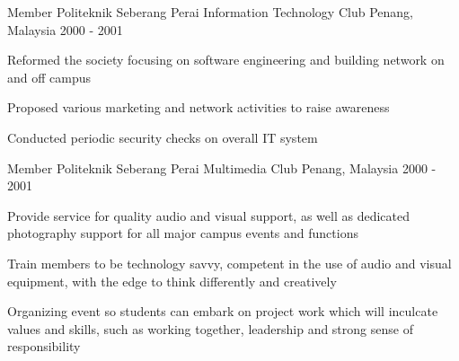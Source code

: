 

\begin{cventries}

  \cventry
    {Member} %
    {Politeknik Seberang Perai Information Technology Club} %
    {Penang, Malaysia} %
    {2000 - 2001} %
    {
      \begin{cvitems} %
        \item {Reformed the society focusing on software engineering and building network on and off campus}
        \item {Proposed various marketing and network activities to raise awareness}
        \item {Conducted periodic security checks on overall IT system}
      \end{cvitems}
    }

  \cventry
    {Member} %
    {Politeknik Seberang Perai Multimedia Club} %
    {Penang, Malaysia} %
    {2000 - 2001} %
    {
      \begin{cvitems} %
      	\item {Provide service for quality audio and visual support, as well as dedicated photography support for all major campus events and functions}
		\item {Train members to be technology savvy, competent in the use of audio and visual equipment, with the edge to think differently and creatively}
		\item {Organizing event so students can embark on project work which will inculcate values and skills, such as working together, leadership and strong sense of responsibility}
      \end{cvitems}
    }
    

\end{cventries}
